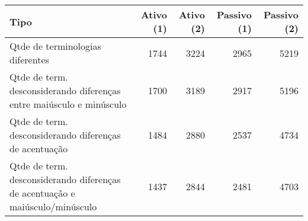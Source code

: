 \begin{table}[ht]
\centering
\begin{tabular}{lrrrr}
  \hline
Tipo & Ativo (1) & Ativo (2) & Passivo (1) & Passivo (2) \\ 
  \hline
Qtde de terminologias diferentes & 1744 & 3224 & 2965 & 5219 \\ 
  Qtde de term. desconsiderando diferenças entre maiúsculo e minúsculo & 1700 & 3189 & 2917 & 5196 \\ 
  Qtde de term. desconsiderando diferenças de acentuação & 1484 & 2880 & 2537 & 4734 \\ 
  Qtde de term. desconsiderando diferenças de acentuação e
          maiúsculo/minúsculo & 1437 & 2844 & 2481 & 4703 \\ 
   \hline
\end{tabular}
\end{table}
